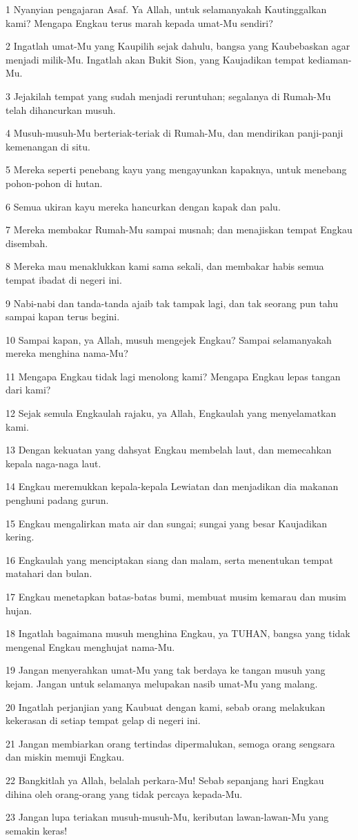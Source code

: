\par 1 Nyanyian pengajaran Asaf. Ya Allah, untuk selamanyakah Kautinggalkan kami? Mengapa Engkau terus marah kepada umat-Mu sendiri?
\par 2 Ingatlah umat-Mu yang Kaupilih sejak dahulu, bangsa yang Kaubebaskan agar menjadi milik-Mu. Ingatlah akan Bukit Sion, yang Kaujadikan tempat kediaman-Mu.
\par 3 Jejakilah tempat yang sudah menjadi reruntuhan; segalanya di Rumah-Mu telah dihancurkan musuh.
\par 4 Musuh-musuh-Mu berteriak-teriak di Rumah-Mu, dan mendirikan panji-panji kemenangan di situ.
\par 5 Mereka seperti penebang kayu yang mengayunkan kapaknya, untuk menebang pohon-pohon di hutan.
\par 6 Semua ukiran kayu mereka hancurkan dengan kapak dan palu.
\par 7 Mereka membakar Rumah-Mu sampai musnah; dan menajiskan tempat Engkau disembah.
\par 8 Mereka mau menaklukkan kami sama sekali, dan membakar habis semua tempat ibadat di negeri ini.
\par 9 Nabi-nabi dan tanda-tanda ajaib tak tampak lagi, dan tak seorang pun tahu sampai kapan terus begini.
\par 10 Sampai kapan, ya Allah, musuh mengejek Engkau? Sampai selamanyakah mereka menghina nama-Mu?
\par 11 Mengapa Engkau tidak lagi menolong kami? Mengapa Engkau lepas tangan dari kami?
\par 12 Sejak semula Engkaulah rajaku, ya Allah, Engkaulah yang menyelamatkan kami.
\par 13 Dengan kekuatan yang dahsyat Engkau membelah laut, dan memecahkan kepala naga-naga laut.
\par 14 Engkau meremukkan kepala-kepala Lewiatan dan menjadikan dia makanan penghuni padang gurun.
\par 15 Engkau mengalirkan mata air dan sungai; sungai yang besar Kaujadikan kering.
\par 16 Engkaulah yang menciptakan siang dan malam, serta menentukan tempat matahari dan bulan.
\par 17 Engkau menetapkan batas-batas bumi, membuat musim kemarau dan musim hujan.
\par 18 Ingatlah bagaimana musuh menghina Engkau, ya TUHAN, bangsa yang tidak mengenal Engkau menghujat nama-Mu.
\par 19 Jangan menyerahkan umat-Mu yang tak berdaya ke tangan musuh yang kejam. Jangan untuk selamanya melupakan nasib umat-Mu yang malang.
\par 20 Ingatlah perjanjian yang Kaubuat dengan kami, sebab orang melakukan kekerasan di setiap tempat gelap di negeri ini.
\par 21 Jangan membiarkan orang tertindas dipermalukan, semoga orang sengsara dan miskin memuji Engkau.
\par 22 Bangkitlah ya Allah, belalah perkara-Mu! Sebab sepanjang hari Engkau dihina oleh orang-orang yang tidak percaya kepada-Mu.
\par 23 Jangan lupa teriakan musuh-musuh-Mu, keributan lawan-lawan-Mu yang semakin keras!

